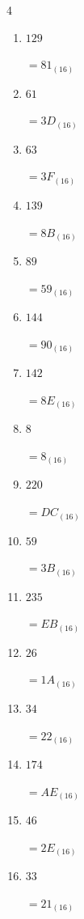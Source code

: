 \begin{multicols}{4}
\begin{enumerate}
  \item $129$

        $=81_{(16)}$

  \item $61$

        $=3D_{(16)}$

\columnbreak %

\resetques

  \item $63$

        $=3F_{(16)}$

  \item $139$

        $=8B_{(16)}$

  \item $89$

        $=59_{(16)}$

  \item $144$

        $=90_{(16)}$

  \item $142$

        $=8E_{(16)}$

  \item $8$

        $=8_{(16)}$

  \item $220$

        $=DC_{(16)}$

  \item $59$

        $=3B_{(16)}$

  \item $235$

        $=EB_{(16)}$

  \item $26$

        $=1A_{(16)}$

  \item $34$

        $=22_{(16)}$

  \item $174$

        $=AE_{(16)}$

  \item $46$

        $=2E_{(16)}$

  \item $33$

        $=21_{(16)}$


\end{enumerate}
\end{multicols}
